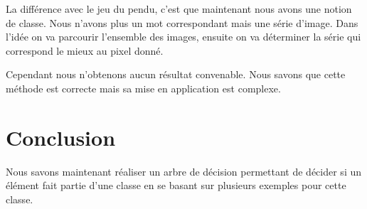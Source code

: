 \documentclass[a4paper,12pt]{report}
\begin{document}
La différence avec le jeu du pendu, c'est que maintenant nous avons une notion de classe. Nous n'avons plus un mot correspondant mais une série d'image. Dans l'idée on va parcourir l'ensemble des images, ensuite on va déterminer la série qui correspond le mieux au pixel donné. 

Cependant nous n'obtenons aucun résultat convenable. Nous savons que cette méthode est correcte mais sa mise en application est complexe.

\section*{Conclusion}

Nous savons maintenant réaliser un arbre de décision permettant de décider si un élément fait partie d'une classe en se basant sur plusieurs exemples pour cette classe.
\end{document}

